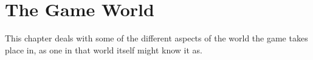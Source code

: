 \chapter{The Game World}

This chapter deals with some of the different aspects of the world the
game takes place in, as one in that world itself might know it as.



